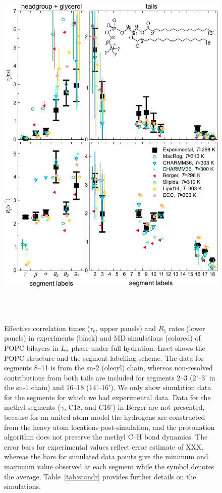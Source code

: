 \documentclass[journal=jpcbfk,manuscript=article,layout=twocolumn]{achemso}
\begin{document}
\begin{figure}[ht!]
\centering
\includegraphics[width=0.9\columnwidth]{normalcond.pdf}
\caption{Effective correlation times ($\tau_\mathrm{e}$, upper panels) and $R_{1}$ rates (lower panels) in experiments (black) and MD simulations (colored) of POPC bilayers in $L_{\alpha}$ phase under full hydration.
Inset shows the POPC structure and the segment labelling scheme.
The data for  segments 8--11 is from the sn-2 (oleoyl) chain, whereas non-resolved contributions from both tails are included for segments 2--3 (2'--3' in the sn-1 chain) and 16--18 (14'--16').
We only show simulation data for the segments for which we had experimental data.
Data for the methyl segments ($\gamma$, C18, and C16') in Berger are not presented, because for an united atom model the hydrogens are constructed from the heavy atom locations post-simulation, and the protonation algorithm does not preserve the methyl C--H bond dynamics.
The error bars for experimental values reflect error estimate of XXX, whereas the 
bars for simulated data points give the minimum and maximum value observed at each segment while the symbol denotes the average. %
Table~\ref{tab:standr} provides further details on the simulations.
}
\label{fig:teff_R1}


 \\
 \\


\end{figure}
\end{document}
